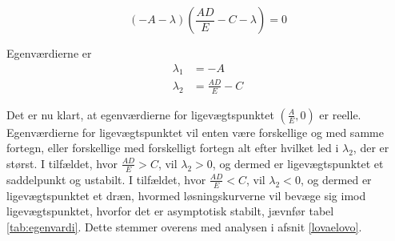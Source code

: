 $$(-A - \lambda)\left(\frac{AD}{E}-C-\lambda\right) = 0$$

Egenværdierne er
\begin{align*}
    \lambda_1&=-A \\
    \lambda_2&=\frac{AD}{E}-C
\end{align*}

Det er nu klart, at egenværdierne for ligevægtspunktet $\left( \frac{A}{E} , 0 \right)$ er reelle. Egenværdierne for ligevægtspunktet vil enten være forskellige og med samme fortegn, eller forskellige med forskelligt fortegn alt efter hvilket led i $\lambda_2$, der er størst. 
I tilfældet, hvor $\frac{AD}{E} > C$, vil $\lambda_2 > 0$, og dermed er ligevægtspunktet et saddelpunkt og ustabilt. I tilfældet, hvor $\frac{AD}{E} < C$, vil $\lambda_2 < 0$, og dermed er ligevægtspunktet et dræn, hvormed løsningskurverne vil bevæge sig imod ligevægtspunktet, hvorfor det er asymptotisk stabilt, jævnfør tabel \ref{tab:egenvardi}. Dette stemmer overens med analysen i afsnit \ref{lovaelovo}. \hfill \break

